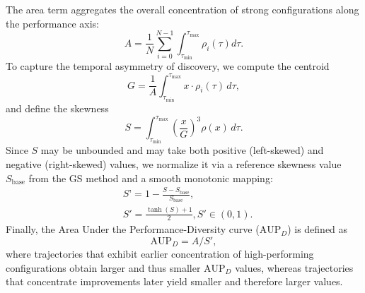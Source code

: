 The area term aggregates the overall concentration of strong configurations along the performance axis:
\begin{equation}
    A = \frac{1}{N} \sum^{N-1}_{i=0} \int_{\tau_{\min}}^{\tau_{\max}} \rho_{i}(\tau)d\tau.
\end{equation}
To capture the temporal asymmetry of discovery, we compute the centroid
\begin{equation}
    G = \frac{1}{A} \int_{\tau_{\min}}^{\tau_{\max}} x \cdot \rho_i(\tau) \, d\tau,
\end{equation}
and define the skewness
\begin{equation}
    S = \int_{\tau_{\min}}^{\tau_{\max}} \left( \frac{x}{G} \right)^3 \rho(x) \, d\tau.
\end{equation}
Since $S$ may be unbounded and may take both positive (left-skewed) and negative (right-skewed) values, we normalize it via a reference skewness value $S_\text{base}$ from the GS method and a smooth monotonic mapping:
\begin{align}
    & S’ = 1-\frac{S-S_\text{base}}{S_\text{base}}, \\
    & S' = \frac{\tanh(S) + 1}{2}, S' \in (0, 1).
\end{align}
Finally, the Area Under the Performance-Diversity curve ($\text{AUP}_D$) is defined as
\begin{equation}
    \text{AUP}_D = A / S',
\end{equation}
where trajectories that exhibit earlier concentration of high-performing configurations obtain larger and thus smaller $\text{AUP}_D$ values, whereas trajectories that concentrate improvements later yield smaller and therefore larger values.